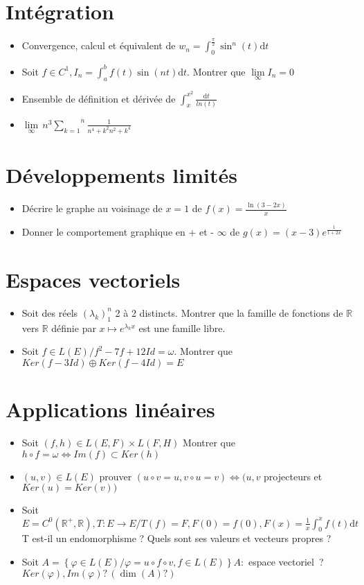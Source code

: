 \documentclass[a4paper, 11pt, french]{article}
\newcommand{\R}{\mathbb{R}}
\newcommand{\la}{\lambda}
\newcommand{\om}{\omega}
\newcommand{\ph}{\varphi}
\newcommand{\dt}{\mathrm{d}t}
\newcommand{\ev}{espace vectoriel}
\newcommand{\som}[2]{\overset{#2}{\underset{#1}{\sum}}}
\newcommand{\inv}[1]{\frac{1}{#1}}
\newcommand{\acc}[1]{\left\{ #1 \right\}}
\begin{document}
	\section*{Intégration}
	\begin{itemize}
 		\item Convergence, calcul et équivalent de $w_n= \int_0^{\frac{\pi}{2}}\sin^n(t)\dt$
 		\item Soit $f \in C^1, I_n=\int_a^b f(t)\sin(nt)\dt.$ Montrer que $\underset{\infty}\lim I_n=0$
 		\item Ensemble de définition et dérivée de $\int_x^{x^2}\frac{\dt}{ln(t)}$
 		\item $\underset{\infty}\lim \, n^3\som{k=1}{n}\inv{n^4+k^2n^2+k^4}$
	\end{itemize}

	\section*{Développements limités}
	\begin{itemize}
 		\item Décrire le graphe au voisinage de $x=1$ de $f(x)=\frac{\ln(3-2x)}{x}$
		\item Donner le comportement graphique en + et - $\infty$ de $g(x)=(x-3)e^{\inv{1+2x}}$
	\end{itemize}

	\section*{Espaces vectoriels}
	\begin{itemize}
 		\item Soit des réels $(\la_k)_1^n$ 2 à 2 distincts. Montrer que la famille de fonctions de $\R$ vers $\R$ définie par $x \mapsto e^{\la_kx}$ est une famille libre.
 		\item Soit $f \in L(E) / f^2-7f+12Id=\om.$ Montrer que $Ker(f-3Id) \oplus Ker(f-4Id)=E$
	\end{itemize}

	\section*{Applications linéaires}
	\begin{itemize}
 		\item Soit $(f,h) \in L(E,F)\times L(F,H)$ Montrer que $h\circ f=\om \iff Im(f) \subset Ker(h)$
 		\item $(u,v) \in L(E)$ prouver $(u\circ v=u, v\circ u=v) \iff (u,v$ projecteurs et ${Ker(u)=Ker(v))}$
 		\item Soit $E=C^0(\R^+,\R), T : E \rightarrow E / T(f)=F, F(0)=f(0), F(x)=\inv{x}\int_0^xf(t)\dt$ T est-il un endomorphisme ? Quels sont ses valeurs et vecteurs propres ?
		\item Soit $A=\acc{\ph \in L(E) / \ph=u\circ f\circ v, f\in L(E)} A :$ \ev \, ? $Ker(\ph), {Im(\ph) ?}\, (\dim(A) ?)$
	\end{itemize}
\end{document}
